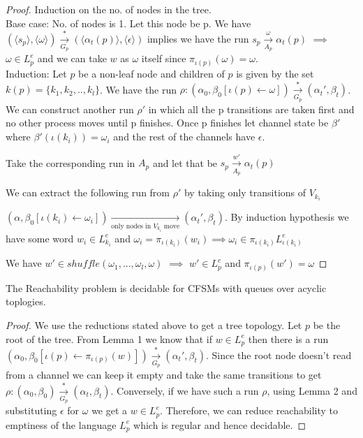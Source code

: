 \documentclass[a4paper,UKenglish,cleveref, autoref, thm-restate]{lipics-v2019}
\begin{document}
\begin{proof}
Induction on the no. of nodes in the tree. \\
\hspace*{0.5cm}Base case: No. of nodes is 1. Let this node be p. We have $(\langle s_p \rangle, \langle \omega \rangle ) \xrightarrow[G_p]{*} (\langle \alpha_t(p) \rangle, \langle \epsilon \rangle)$ implies we have the run $s_p \xrightarrow[A_p]{\omega } \alpha_t(p)$ $\implies$ $\omega \in L_p^e$ and we can take $w$ as $\omega$ itself since $\pi_{\iota(p)}(\omega) = \omega$. \\
\hspace*{0.5cm}Induction: Let $p$ be a non-leaf node and children of $p$ is given by the set $k(p) = \{k_1, k_2, .., k_l\}$. We have the run $\rho: (\alpha_0, \beta_0[\iota(p) \leftarrow \omega]) \xrightarrow[G_p]{*} (\alpha_t', \beta_t)$. 
We can construct another run $\rho'$ in which all the p transitions are taken first and no other process moves until p finishes. Once p finishes let channel state be $\beta'$ 
where $\beta'(\iota(k_i)) = \omega_i$ and the rest of the channels have $\epsilon$. 

Take the corresponding run in $A_p$ and let that be $s_p \xrightarrow[A_p]{w'} \alpha_t(p)$

We can extract the following run from $\rho'$ by taking only transitions of $V_{k_i}$ 

$(\alpha, \beta_0[\iota(k_i) \leftarrow \omega_i]) \xrightarrow[\text{only nodes in $V_{k_i}$ move}]{} (\alpha_t', \beta_t)$. By induction hypothesis we have some word $w_i \in L_{k_i}^e$ and $\omega_i = \pi_{\iota(k_i)}(w_i) \implies \omega_i \in \pi_{\iota(k_i)}L_{\iota(k_i)}^e$

We have $w' \in shuffle(\omega_1, ..., \omega_l, \omega)$ 
$\implies$ $w' \in L_p^e$ and $\pi_{\iota(p)}(w') = \omega$


\end{proof}
    

   
\begin{theorem}\label{testenv-theorem}
    The Reachability problem is decidable for CFSMs with queues over acyclic toplogies. 
   \end{theorem}

   
\begin{proof}
    We use the reductions stated above to get a tree topology. Let $p$ be the root of the tree. From Lemma 1 we know that if $w \in L_p^e$ then there is a run  $(\alpha_0, \beta_0[\iota(p) \leftarrow \pi_{\iota(p)}(w) ]) \xrightarrow[G_p]{*} (\alpha_t', \beta_t)$. Since the root node doesn't read from a channel we can keep it empty and take the same transitions to get $\rho: (\alpha_0, \beta_0) \xrightarrow[G_p]{*} (\alpha_t, \beta_t)$. Conversely, if we have such a run $\rho$, using Lemma 2 and substituting $\epsilon$ for $\omega$ we get a $w \in L_p^e$. Therefore, we can reduce reachability to emptiness of the language $L_p^e$ which is regular and hence decidable. 

    
   \end{proof}
\end{document}
